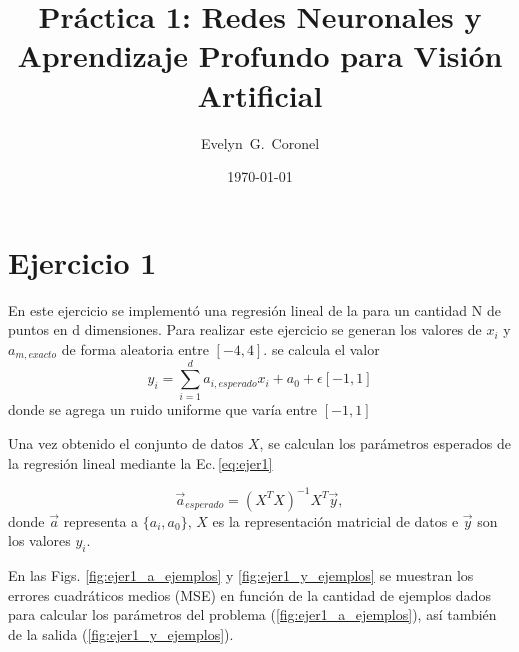 





\title{Práctica 1: Redes Neuronales y Aprendizaje Profundo para Visión Artificial}
\author{Evelyn~G.~Coronel}


\date[]{\lowercase{\today}} %


\maketitle


\section*{Ejercicio 1}

En este ejercicio se implementó una regresión lineal de la  para un cantidad N de puntos en d dimensiones.  Para realizar este ejercicio se generan los valores de $x_i$ y $a_{m,exacto}$ de forma aleatoria entre $[-4,4]$. se calcula el valor
\begin{equation}
  y_i= \sum_{i=1}^d a_{i,esperado}x_i+ a_0 + \epsilon[-1,1]  
\end{equation}
donde se agrega un ruido uniforme que varía entre $[-1,1]$

Una vez obtenido el conjunto de datos $X$, se calculan  los parámetros esperados de la regresión lineal mediante la Ec.\,\ref{eq:ejer1}

\begin{equation}
     \vec a_{esperado} = (X^TX)^{-1}X^T \vec y,
     \label{eq:ejer1}
 \end{equation} 
donde $\vec a$ representa a $\{a_i, a_0 \}$, $X$ es la representación matricial de datos e $\vec y$ son los valores $y_i$.

En las Figs.  \ref{fig:ejer1_a_ejemplos} y \ref{fig:ejer1_y_ejemplos}  se muestran los errores cuadráticos medios  (MSE) en función de la cantidad de ejemplos dados para calcular los parámetros del problema (\ref{fig:ejer1_a_ejemplos}), así también de la salida (\ref{fig:ejer1_y_ejemplos}). 

